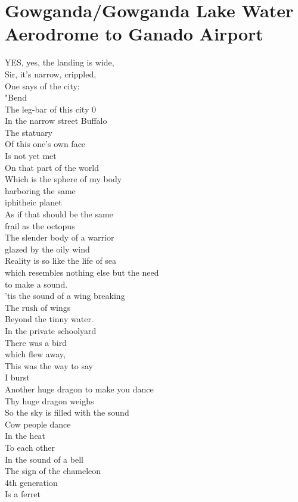 \documentclass[smalldemyvopaper,11pt,twoside,onecolumn,openright,extrafontsizes]{memoir}
\begin{document}
\chapter{Gowganda/Gowganda Lake Water Aerodrome to Ganado Airport}
YES, yes, the landing is wide,
\\Sir, it's narrow, crippled,
\\One says of the city:
\\"Bend
\\The leg-bar of this city 0
\\In the narrow street Buffalo
\\The statuary
\\Of this one's own face
\\Is not yet met
\\On that part of the world
\\Which is the sphere of my body
\\harboring the same
\\iphitheic planet
\\As if that should be the same
\\frail as the octopus
\\The slender body of a warrior
\\glazed by the oily wind
\\Reality is so like the life of sea
\\which resembles nothing else but the need
\\to make a sound.
\\'tis the sound of a wing breaking
\\The rush of wings
\\Beyond the tinny water.
\\In the private schoolyard
\\There was a bird
\\which flew away,
\\This was the way to say
\\I burst
\\Another huge dragon to make you dance
\\Thy huge dragon weighs
\\So the sky is filled with the sound
\\Cow people dance
\\In the heat
\\To each other
\\In the sound of a bell
\\The sign of the chameleon
\\4th generation
\\Is a ferret
\end{document}
